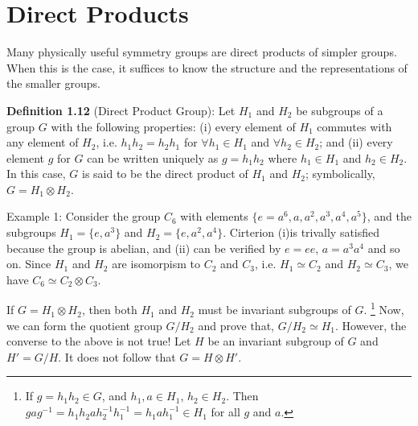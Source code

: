 \section{Direct Products}
Many physically useful symmetry groups are direct products of simpler groups.
When this is the case, it suffices to know the structure and the representations of the smaller groups.

\textbf{Definition 1.12} (Direct Product Group): Let $H_{1}$ and $H_{2}$ be subgroups of a group $G$ with the following properties: (i) every element of $H_{1}$ commutes with any element of $H_{2}$, i.e. $h_{1}h_{2} = h_{2} h_{1}$ for $\forall h_{1} \in H_{1}$ and $\forall h_{2}\in H_{2}$; and (ii) every element $g$ for $G$ can be written uniquely as $g=h_{1}h_{2}$ where $h_{1}\in H_{1}$ and $h_{2}\in H_{2}$.
In this case, $G$ is said to be the direct product of $H_{1}$ and $H_{2}$; symbolically, $G= H_{1}\otimes H_{2}$.

\textrm{Example 1}: Consider the group $C_{6}$ with elements $\{e = a^{6}, a, a^{2}, a^{3}, a^{4}, a^{5}\}$, and the subgroups $H_{1} = \{e, a^{3}\}$ and $H_{2} = \{e, a^{2}, a^{4}\}$.
Cirterion (i)is trivally satisfied because the group is abelian, and (ii) can be verified by $e=ee$, $a = a^{3} a^{4}$ and so on.
Since $H_{1}$ and $H_{2}$ are isomorpism to $C_{2}$ and $C_{3}$, i.e. $H_{1} \simeq C_{2}$ and $H_{2} \simeq C_{3}$, we have $C_{6} \simeq C_{2} \otimes C_{3}$.

If $G= H_{1}\otimes H_{2}$, then both $H_{1}$ and $H_{2}$ must be invariant subgroups of $G$.
\footnote{If $g=h_{1}h_{2}\in G$, and $h_{1}, a \in H_{1}$, $h_{2}\in H_{2}$. Then $g a g^{-1} = h_{1}h_{2} a h_{2}^{-1} h_{1}^{-1} = h_{1} a h_{1}^{-1} \in H_{1}$ for all $g$ and $a$.}
Now, we can form the quotient group $G/H_{2}$ and prove that, $G/H_{2} \simeq H_{1}$.
However, the converse to the above is not true!
Let $H$ be an invariant subgroup of $G$ and $H'= G/H$.
It does not follow that $G = H \otimes H'$.


